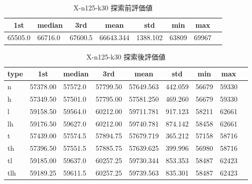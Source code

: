 \begin{table}[htbp]
    \caption{X-n125-k30 探索前評価値}
    \begin{tabular}{|l|l|l|l|l|l|l|l|}\hline
    \multicolumn{1}{|c|}{\textbf{1st}}
    &\multicolumn{1}{c|}{\textbf{median}}
    &\multicolumn{1}{c|}{\textbf{3rd}}
    &\multicolumn{1}{c|}{\textbf{mean}}
    &\multicolumn{1}{c|}{\textbf{std}}
    &\multicolumn{1}{c|}{\textbf{min}}
    &\multicolumn{1}{c|}{\textbf{max}}\\\hline
	65505.0 & 66716.0 & 67600.5 & 66643.344 & 1388.102 & 63809 & 69967\\\hline
	\end{tabular}
\end{table}
\begin{table}[htbp]
    \caption{X-n125-k30 探索後評価値}
    \begin{tabular}{|l|l|l|l|l|l|l|l|l|}\hline
    \multicolumn{1}{|c|}{\textbf{type}}
    &\multicolumn{1}{|c|}{\textbf{1st}}
    &\multicolumn{1}{c|}{\textbf{median}}
    &\multicolumn{1}{c|}{\textbf{3rd}}
    &\multicolumn{1}{c|}{\textbf{mean}}
    &\multicolumn{1}{c|}{\textbf{std}}
    &\multicolumn{1}{c|}{\textbf{min}}
    &\multicolumn{1}{c|}{\textbf{max}}\\\hline
	n & 57378.00 & 57572.0 & 57799.50 & 57649.563 & 442.059 & 56679 & 59330\\\hline
	h & 57349.50 & 57501.0 & 57795.00 & 57581.250 & 469.260 & 56679 & 59330\\\hline
	l & 59158.50 & 59564.0 & 60212.00 & 59711.781 & 917.123 & 58211 & 62661\\\hline
	lh & 59176.50 & 59627.0 & 60212.00 & 59740.781 & 874.142 & 58458 & 62661\\\hline
	t & 57439.00 & 57574.5 & 57894.75 & 57679.719 & 365.212 & 57158 & 58716\\\hline
	th & 57396.50 & 57551.5 & 57885.75 & 57639.625 & 399.996 & 56980 & 58716\\\hline
	tl & 59185.00 & 59637.0 & 60257.25 & 59730.344 & 853.353 & 58487 & 62423\\\hline
	tlh & 59189.25 & 59611.5 & 60257.25 & 59739.563 & 835.301 & 58487 & 62423\\\hline
	\end{tabular}
\end{table}
